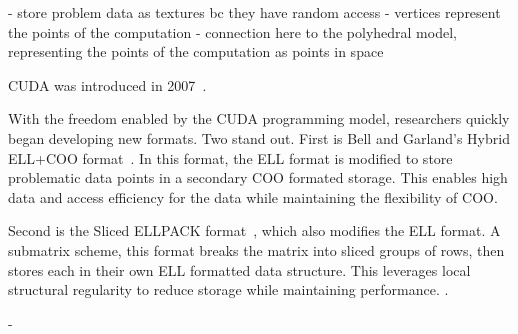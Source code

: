 \cite{fan2004gpu}
- store problem data as textures bc they have random access
- vertices represent the points of the computation
- connection here to the polyhedral model, representing the points of the computation as points in space


CUDA was introduced in 2007~\cite{cuda2007v1.0}.

With the freedom enabled by the CUDA programming model, researchers quickly began developing new formats.
Two stand out. 
First is Bell and Garland's Hybrid ELL+COO format~\cite{bell2009implementing,bell2008efficient}.
In this format, the ELL format is modified to store problematic data points in a secondary COO formated storage. 
This enables high data and access efficiency for the data while maintaining the flexibility of COO.

Second is the Sliced ELLPACK format~\cite{monakov2010automatically}, which also modifies the ELL format.
A submatrix scheme, this format breaks the matrix into sliced groups of rows, then stores each in their own ELL formatted data structure. 
This leverages local structural regularity to reduce storage while maintaining performance. 
. 




\cite{williams2007optimization}
- 



